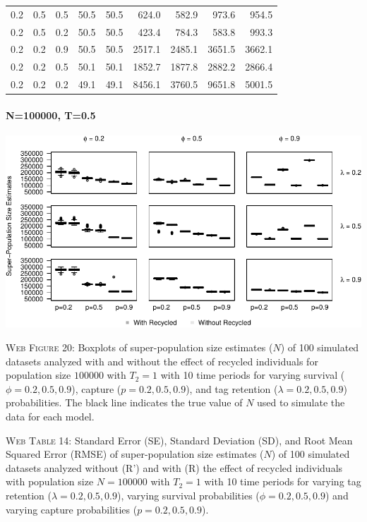 \documentclass[]{article}
\let\oldparagraph\paragraph
\renewcommand{\paragraph}[1]{\oldparagraph{#1}\mbox{}}
\begin{document}
\begin{table}[ht]
{\begin{tabular}{rrrrrrrrr}
  0.2 & 0.5 & 0.5 & 50.5 & 50.5 & 624.0 & 582.9 & 973.6 & 954.5 \\ 
  0.2 & 0.5 & 0.2 & 50.5 & 50.5 & 423.4 & 784.3 & 583.8 & 993.3 \\ 
  0.2 & 0.2 & 0.9 & 50.5 & 50.5 & 2517.1 & 2485.1 & 3651.5 & 3662.1 \\ 
  0.2 & 0.2 & 0.5 & 50.1 & 50.1 & 1852.7 & 1877.8 & 2882.2 & 2866.4 \\ 
  0.2 & 0.2 & 0.2 & 49.1 & 49.1 & 8456.1 & 3760.5 & 9651.8 & 5001.5 \\ 
   \hline
\end{tabular}
}
\endgroup
\end{table}

\newpage

\paragraph{N=100000, T=0.5}\label{n100000-t0.5-3}

\includegraphics{Appendix_BW_files/figure-latex/figure20_superN_GJSTL2-1.pdf}

\textsc{Web Figure 20:} Boxplots of super-population size estimates
(\(N\)) of 100 simulated datasets analyzed with and without the effect
of recycled individuals for population size \(100000\) with \(T_2=1\)
with 10 time periods for varying survival (\(\phi=0.2,0.5,0.9\)),
capture (\(p=0.2,0.5,0.9\)), and tag retention (\(\lambda=0.2,0.5,0.9\))
probabilities. The black line indicates the true value of \(N\) used to
simulate the data for each model.

\textsc{Web Table 14:} Standard Error (SE), Standard Deviation (SD), and
Root Mean Squared Error (RMSE) of super-population size estimates
(\(N\)) of 100 simulated datasets analyzed without (R') and with (R) the
effect of recycled individuals with population size \(N=100000\) with
\(T_2=1\) with 10 time periods for varying tag retention
(\(\lambda=0.2,0.5,0.9\)), varying survival probabilities
(\(\phi=0.2,0.5,0.9\)) and varying capture probabilities
(\(p=0.2,0.5,0.9\)).
\end{document}
